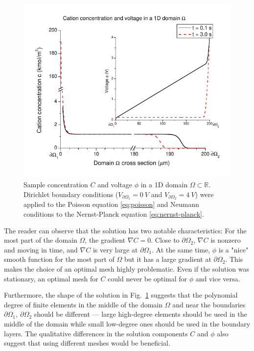 \begin{figure}[!ht]
  \begin{centering}
      \includegraphics{comsol_conc_volt}
  \caption{Sample concentration $C$ and voltage $\phi$
           in a 1D domain $\Omega\subset\mathbb{R}$.
           Dirichlet boundary conditions ($V_{\partial \Omega_1}=0\ V$
           and $V_{\partial \Omega_2}=4\ V$) were
	   applied to the Poisson equation \eqref{eq:poisson} and Neumann conditions
	   to the Nernst-Planck equation \eqref{eq:nernst-planck}.}
\label{fig:comsol-conc-volt}
  \end{centering}
\end{figure}





The reader can observe that the solution has 
two notable characteristics: For the most part of the domain $\Omega$,
the gradient $\nabla C = 0$. Close to $\partial \Omega_2$, $\nabla C$ is
nonzero and moving in time, and $\nabla C$ is very large at $\partial \Omega_1$.
At the same time, $\phi$ is a "nice" smooth function for the most part of 
$\Omega$ but it has a large gradient at $\partial \Omega_2$.
This makes the choice of an optimal mesh highly problematic. Even if the 
solution was stationary, an optimal mesh for $C$ could never be 
optimal for $\phi$ and vice versa.





Furthermore, the shape of the solution in Fig.~\ref{fig:comsol-conc-volt}
suggests that the polynomial degree of finite elements in the middle
of the domain $\Omega$ and near the boundaries $\partial \Omega_1,\ \partial \Omega_2$
should be different --- large high-degree elements should be used in the middle of the 
domain while small low-degree ones should be used in the boundary layers.  
The qualitative differences in the solution components $C$ and $\phi$ 
also suggest that using different meshes would be beneficial. 

